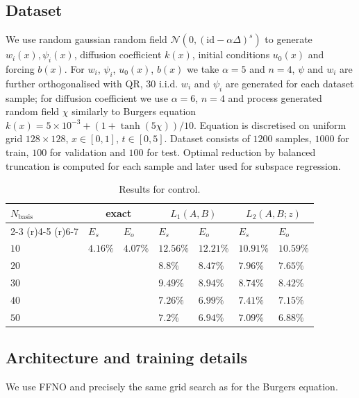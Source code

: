 \documentclass{article}
\begin{document}
\subsection{Dataset}
We use random gaussian random field $\mathcal{N}\left(0, \left(\text{id} - \alpha \Delta\right)^s\right)$ to generate $w_i(x), \psi_i(x)$, diffusion coefficient $k(x)$, initial conditions $u_{0}(x)$ and forcing $b(x)$. For $w_i$, $\psi_i$, $u_{0}(x)$, $b(x)$ we take $\alpha = 5$ and $n=4$, $\psi$ and $w_i$ are further orthogonalised with QR, $30$ i.i.d. $w_i$ and $\psi_i$ are generated for each dataset sample; for diffusion coefficient we use $\alpha = 6$, $n = 4$ and process generated random field $\chi$ similarly to Burgers equation $k(x) = 5\times 10^{-3} + (1 + \tanh(5 \chi))/10$. Equation is discretised on uniform grid $128\times128$, $x\in[0, 1]$, $t\in[0,5]$.  Dataset consists of $1200$ samples, $1000$ for train, $100$ for validation and $100$ for test. Optimal reduction by balanced truncation is computed for each sample and later used for subspace regression.

\begin{table}[t!]
    \caption{Results for control.}
    \label{table:control_results}
    \centering
\begin{tabular}{lllllll}
\toprule
$N_{\text{basis}}$ & \multicolumn{2}{c}{exact} & \multicolumn{2}{c}{$L_1(A, B)$} & \multicolumn{2}{c}{$L_2(A, B;z)$} \\
 \cmidrule(r){2-3} \cmidrule(r){4-5} \cmidrule(r){6-7}
 & $E_{s}$ & $E_{o}$ & $E_{s}$ & $E_{o}$ & $E_{s}$ & $E_{o}$\\
\midrule
$10$ & $4.16\%$ & $4.07\%$ & $12.56\%$ & $12.21\%$ & $10.91\%$ & $10.59\%$\\
$20$ &  &  & $8.8\%$ & $8.47\%$ & $7.96\%$ & $7.65\%$\\
$30$ &  &  & $9.49\%$ & $8.94\%$ & $8.74\%$ & $8.42\%$\\
$40$ &  &  & $7.26\%$ & $6.99\%$ & $7.41\%$ & $7.15\%$\\
$50$ &  &  & $7.2\%$ & $6.94\%$ & $7.09\%$ & $6.88\%$\\
\bottomrule
\end{tabular}
\end{table}

\subsection{Architecture and training details}
We use FFNO and precisely the same grid search as for the Burgers equation.
\end{document}
